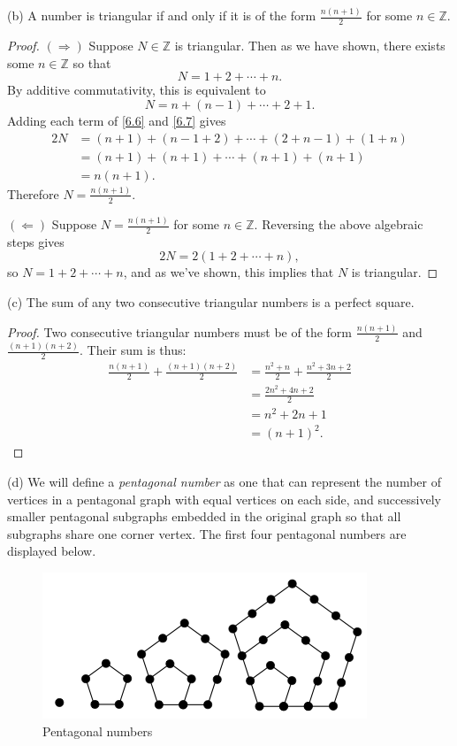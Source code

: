 \begin{problem}[3]
\noindent (b) A number is triangular if and only if it is of the form $\frac{n(n+1)} 2$ for some $n \in \mathbb Z$. 
\begin{proof} $(\Longrightarrow)$ Suppose $N \in \mathbb Z$ is triangular. Then as we have shown, there exists some $n \in \mathbb Z$ so that 
\begin{equation} \label{6.6}
N = 1 + 2 + \cdots + n.
\end{equation}
By additive commutativity, this is equivalent to 
\begin{equation} \label{6.7}
N = n + (n-1) + \cdots + 2 + 1.
\end{equation}
Adding each term of \ref{6.6} and \ref{6.7} gives
\begin{align*}
2N &= (n+1) + (n-1 + 2) + \cdots + (2+n-1) + (1+n) \\
&= (n+1) + (n+1) + \cdots + (n+1) + (n+1) \\
&= n(n+1).
\end{align*}
Therefore $N = \frac{n(n+1)}2$. 

$(\Longleftarrow)$ Suppose $N = \frac{n(n+1)}2$ for some $n \in \mathbb Z$. Reversing the above algebraic steps gives
\[
2N = 2(1 + 2 + \cdots + n),
\]
so $N = 1 + 2 + \cdots + n$, and as we've shown, this implies that $N$ is triangular. \end{proof}

\noindent (c) The sum of any two consecutive triangular numbers is a perfect square. 
\begin{proof} Two consecutive triangular numbers must be of the form $\frac{n(n+1)}2$ and $\frac{(n+1)(n+2)}2$. Their sum is thus: 
\begin{align*}
\frac{n(n+1)}2 + \frac{(n+1)(n+2)}2 &= \frac{n^2 + n}2 + \frac{n^2 + 3n + 2}{2}\\
&= \frac{2n^2 + 4n + 2}2 \\
&= n^2 + 2n + 1 \\
&=(n+1)^2.
\end{align*} 
\end{proof}

\noindent (d) We will define a \emph{pentagonal number} as one that can represent the number of vertices in a pentagonal graph with equal vertices on each side, and successively smaller pentagonal subgraphs embedded in the original graph so that all subgraphs share one corner vertex. The first four pentagonal numbers are displayed below. 

\begin{figure}
\centering
\includegraphics{pentagonal}
\caption{Pentagonal numbers}
\end{figure}

\end{problem}


